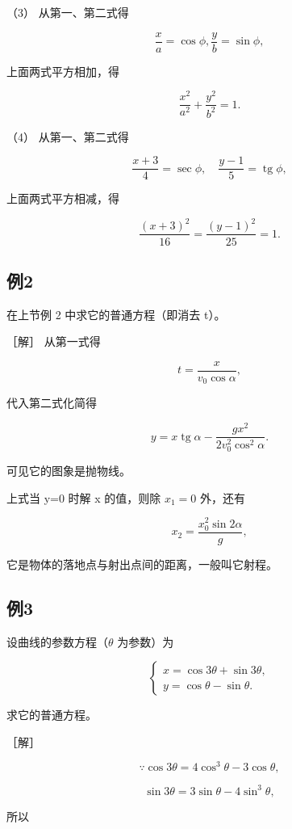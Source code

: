 （3） 从第一、第二式得

\[
\frac {x}{a} = \cos \phi, \frac {y}{b} = \sin \phi,
\]

上面两式平方相加，得

\[
\frac {x^{2}}{a^{2}} + \frac {y^{2}}{b^{2}} = 1.
\]

（4） 从第一、第二式得

\[
\frac {x + 3}{4} = \sec \phi, \quad \frac {y - 1}{5} = \operatorname{tg} \phi,
\]

上面两式平方相减，得

\[
\frac {(x + 3) ^ {2}}{16} = \frac {(y - 1) ^ {2}}{25} = 1.
\]

\subsection{例2}\label{ux4f8b2-39}

在上节例 2 中求它的普通方程（即消去 t）。

［解］ 从第一式得

\[
t = \frac {x}{v_{0} \cos \alpha},
\]

代入第二式化简得

\[
y = x \operatorname{tg} \alpha - \frac {g x^{2}}{2 v_{0} ^ {2} \cos^{2} \alpha}.
\]

可见它的图象是抛物线。

上式当 y=0 时解 x 的值，则除 \(x_{1}=0\) 外，还有

\[
x_{2} = \frac {x_{0} ^ {2} \sin 2 \alpha}{g},
\]

它是物体的落地点与射出点间的距离，一般叫它射程。

\subsection{例3}\label{ux4f8b3-27}

设曲线的参数方程（\(\theta\) 为参数）为

\[
\left\{ \begin{array}{l} x = \cos 3 \theta + \sin 3 \theta, \\ y = \cos \theta - \sin \theta. \end{array} \right. \tag {1}
\]

求它的普通方程。

［解］

\[
\because \cos 3 \theta = 4 \cos^{3} \theta - 3 \cos \theta,
\]

\[
\sin 3 \theta = 3 \sin \theta - 4 \sin^{3} \theta,
\]

所以

